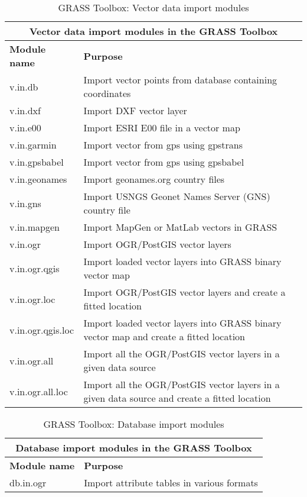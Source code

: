 \begin{table}[ht]
\centering
\caption{GRASS Toolbox: Vector data import modules}\medskip
 \begin{tabular}{|p{4cm}|p{12cm}|}
  \hline \multicolumn{2}{|c|}{\textbf{Vector data import modules in the GRASS
Toolbox}} \\
  \hline \textbf{Module name} & \textbf{Purpose} \\
  \hline v.in.db & Import vector points from database containing coordinates \\
  \hline v.in.dxf & Import DXF vector layer \\
  \hline v.in.e00 & Import ESRI E00 file in a vector map \\
  \hline v.in.garmin & Import vector from gps using gpstrans \\
  \hline v.in.gpsbabel & Import vector from gps using gpsbabel \\
  \hline v.in.geonames & Import geonames.org country files \\
  \hline v.in.gns & Import USNGS Geonet Names Server (GNS) country file  \\
  \hline v.in.mapgen & Import MapGen or MatLab vectors in GRASS \\
  \hline v.in.ogr & Import OGR/PostGIS vector layers \\
  \hline v.in.ogr.qgis & Import loaded vector layers into GRASS binary
  vector map \\
  \hline v.in.ogr.loc & Import OGR/PostGIS vector layers and create a fitted
  location \\
  \hline v.in.ogr.qgis.loc & Import loaded vector layers into GRASS binary
  vector map and create a fitted location \\
  \hline v.in.ogr.all & Import all the OGR/PostGIS vector layers in a given
  data source \\
  \hline v.in.ogr.all.loc & Import all the OGR/PostGIS vector layers in a
  given data source and create a fitted location \\
\hline
\end{tabular}
\end{table}

\begin{table}[ht]
\centering
\caption{GRASS Toolbox: Database import modules}\medskip
 \begin{tabular}{|p{4cm}|p{12cm}|}
  \hline \multicolumn{2}{|c|}{\textbf{Database import modules in the GRASS
Toolbox}} \\
  \hline \textbf{Module name} & \textbf{Purpose} \\
  \hline db.in.ogr & Import attribute tables in various formats \\
\hline
\end{tabular}
\end{table}

